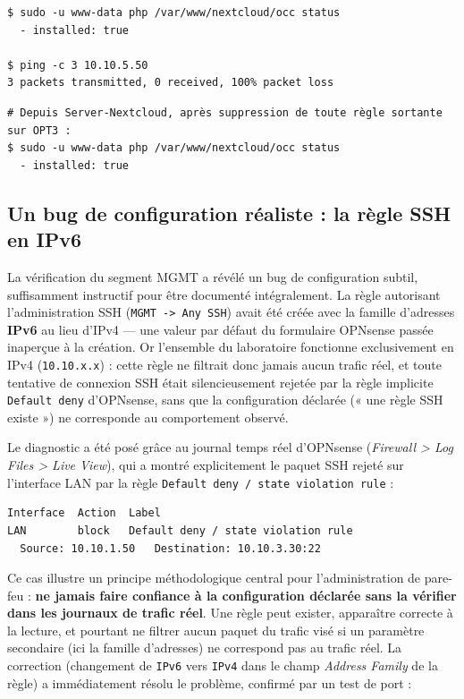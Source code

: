 \begin{lstlisting}[caption={Vérification APPS : service fonctionnel, mouvement latéral bloqué}]
$ sudo -u www-data php /var/www/nextcloud/occ status
  - installed: true

$ ping -c 3 10.10.5.50
3 packets transmitted, 0 received, 100% packet loss
\end{lstlisting}

\begin{lstlisting}[caption={Vérification DB : aucune règle sortante, service toujours accessible}]
# Depuis Server-Nextcloud, après suppression de toute règle sortante sur OPT3 :
$ sudo -u www-data php /var/www/nextcloud/occ status
  - installed: true
\end{lstlisting}

\subsection{Un bug de configuration réaliste : la règle SSH en IPv6}

La vérification du segment MGMT a révélé un bug de configuration subtil,
suffisamment instructif pour être documenté intégralement. La règle
autorisant l'administration SSH (\texttt{MGMT -> Any SSH}) avait été créée
avec la famille d'adresses \textbf{IPv6} au lieu d'IPv4 — une valeur par
défaut du formulaire OPNsense passée inaperçue à la création. Or
l'ensemble du laboratoire fonctionne exclusivement en IPv4
(\texttt{10.10.x.x}) : cette règle ne filtrait donc jamais aucun trafic
réel, et toute tentative de connexion SSH était silencieusement rejetée
par la règle implicite \texttt{Default deny} d'OPNsense, sans que la
configuration déclarée (« une règle SSH existe ») ne corresponde au
comportement observé.

Le diagnostic a été posé grâce au journal temps réel d'OPNsense
(\emph{Firewall > Log Files > Live View}), qui a montré explicitement le
paquet SSH rejeté sur l'interface LAN par la règle \texttt{Default deny /
state violation rule} :

\begin{lstlisting}
Interface  Action  Label
LAN        block   Default deny / state violation rule
  Source: 10.10.1.50   Destination: 10.10.3.30:22
\end{lstlisting}

Ce cas illustre un principe méthodologique central pour l'administration
de pare-feu : \textbf{ne jamais faire confiance à la configuration
déclarée sans la vérifier dans les journaux de trafic réel}. Une règle
peut exister, apparaître correcte à la lecture, et pourtant ne filtrer
aucun paquet du trafic visé si un paramètre secondaire (ici la famille
d'adresses) ne correspond pas au trafic réel. La correction (changement de
\texttt{IPv6} vers \texttt{IPv4} dans le champ \emph{Address Family} de la
règle) a immédiatement résolu le problème, confirmé par un test de port :

